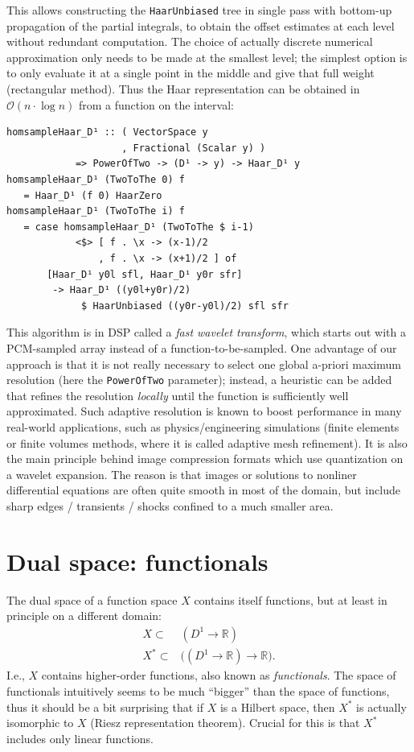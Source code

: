 \documentclass[sigplan,review,anonymous]{acmart}\settopmatter{printfolios=true,printccs=false,printacmref=false}
\theoremstyle{acmplain}
\theoremstyle{acmdefinition}
\begin{document}
This allows constructing the \lstinline`HaarUnbiased` tree in single pass with bottom-up propagation of the partial integrals, to obtain the offset estimates at each level without redundant computation. The choice of actually discrete numerical approximation only needs to be made at the smallest level; the simplest option is to only evaluate it at a single point in the middle and give that full weight (rectangular method). Thus the Haar representation can be obtained in $\mathcal{O}(n\cdot\log n)$ from a function on the interval:
\begin{lstlisting}
homsampleHaar_D¹ :: ( VectorSpace y
                    , Fractional (Scalar y) )
            => PowerOfTwo -> (D¹ -> y) -> Haar_D¹ y
homsampleHaar_D¹ (TwoToThe 0) f
   = Haar_D¹ (f 0) HaarZero
homsampleHaar_D¹ (TwoToThe i) f
   = case homsampleHaar_D¹ (TwoToThe $ i-1)
            <$> [ f . \x -> (x-1)/2
                , f . \x -> (x+1)/2 ] of
       [Haar_D¹ y0l sfl, Haar_D¹ y0r sfr]
        -> Haar_D¹ ((y0l+y0r)/2)
             $ HaarUnbiased ((y0r-y0l)/2) sfl sfr
\end{lstlisting}
This algorithm is in DSP called a \emph{fast wavelet transform}, which starts out with a PCM-sampled array instead of a function-to-be-sampled.
One advantage of our approach is that it is not really necessary to select one global a-priori maximum resolution (here the \lstinline`PowerOfTwo` parameter); instead, a heuristic can be added that refines the resolution \emph{locally} until the function is sufficiently well approximated.
Such adaptive resolution is known to boost performance in many real-world applications, such as physics/engineering simulations (finite elements or finite volumes methods, where it is called adaptive mesh refinement). It is also the main principle behind image compression formats which use quantization on a wavelet expansion.
The reason is that images or solutions to nonliner differential equations are often quite smooth in most of the domain, but include sharp edges / transients / shocks confined to a much smaller area.

\section{Dual space: functionals}
The dual space of a function space $X$ contains itself functions, but at least in principle on a different domain:
\begin{align*}
  X \subset& (D^1 \to \mathbb{R})
 \\
  X^\ast \subset& \bigl((D^1 \to \mathbb{R}) \to \mathbb{R}\bigr).
\end{align*}
I.e., $X$ contains higher-order functions, also known as \emph{functionals}.
The space of functionals intuitively seems to be much “bigger” than the space of functions, thus it should be a bit surprising that if $X$ is a Hilbert space, then $X^\ast$ is actually isomorphic to $X$ (Riesz representation theorem). Crucial for this is that $X^\ast$ includes only linear functions.
\end{document}
